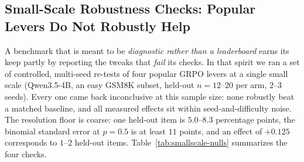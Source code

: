 %

\subsection{Small-Scale Robustness Checks: Popular Levers Do Not Robustly Help}
\label{sec:smallscale-nulls}

A benchmark that is meant to be \emph{diagnostic rather than a
leaderboard} earns its keep partly by reporting the tweaks that
\emph{fail} its checks. In that spirit we ran a set of controlled,
multi-seed re-tests of four popular GRPO levers at a single small scale
(Qwen3.5-4B, an easy GSM8K subset, held-out $n{=}12$--$20$ per arm,
$2$--$3$ seeds). Every one came back inconclusive at this sample
size: none robustly beat a matched baseline, and all measured
effects sit within seed-and-difficulty noise. The resolution floor
is coarse: one held-out item is $5.0$--$8.3$ percentage points, the
binomial standard error at $p{=}0.5$ is at least $11$ points, and
an effect of $+0.125$ corresponds to $1$--$2$ held-out items.
Table~\ref{tab:smallscale-nulls} summarizes the four checks.

